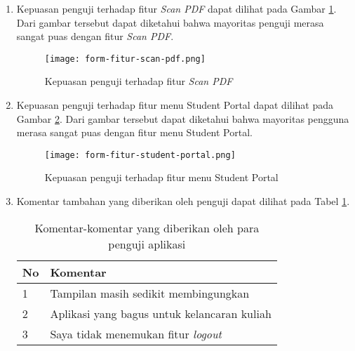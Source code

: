 \begin{enumerate}
\item Kepuasan penguji terhadap fitur \textit{Scan PDF} dapat dilihat pada Gambar \ref{responses:feature:scanPDF}. Dari gambar tersebut dapat diketahui bahwa mayoritas penguji merasa sangat puas dengan fitur \textit{Scan PDF}.
\begin{figure}[H] 
	\centering  
	\texttt{[image: form-fitur-scan-pdf.png]}  
	\caption[Kepuasan penguji terhadap fitur \textit{Scan PDF}] {Kepuasan penguji terhadap fitur \textit{Scan PDF}} 
	\label{responses:feature:scanPDF} 
\end{figure}

\item Kepuasan penguji terhadap fitur menu Student Portal dapat dilihat pada Gambar \ref{responses:feature:stupor}. Dari gambar tersebut dapat diketahui bahwa mayoritas pengguna merasa sangat puas dengan fitur menu Student Portal.
\begin{figure}[H] 
	\centering  
	\texttt{[image: form-fitur-student-portal.png]}  
	\caption[Kepuasan penguji terhadap fitur menu Student Portal] {Kepuasan penguji terhadap fitur menu Student Portal} 
	\label{responses:feature:stupor} 
\end{figure}

\item Komentar tambahan yang diberikan oleh penguji dapat dilihat pada Tabel \ref{responses:comments}.

\begin{table}[ht]
\caption{Komentar-komentar yang diberikan oleh para penguji aplikasi}
\centering
\begin{tabular}{|l | l |}
\hline
\textbf{No} & \textbf{Komentar} \\  \hline
1 &  Tampilan masih sedikit membingungkan \\ \hline
2 & Aplikasi yang bagus untuk kelancaran kuliah \\ \hline
3 &  Saya tidak menemukan fitur \textit{logout} \\ 
\hline
\end{tabular}
\label{responses:comments}
\end{table}

\end{enumerate}



